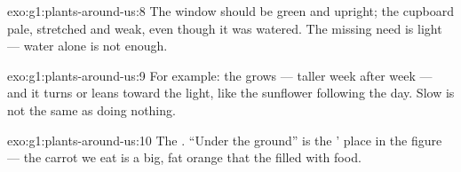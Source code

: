 \begin{solution}{exo:g1:plants-around-us:8}
The window  should be green and upright; the cupboard 
pale, stretched and weak, even though it was watered. The missing
need is light --- water alone is not enough.
\end{solution}

\begin{solution}{exo:g1:plants-around-us:9}
For example: the  grows --- taller week after week --- and it
turns or leans toward the light, like the sunflower following the
day. Slow is not the same as doing nothing.
\end{solution}

\begin{solution}{exo:g1:plants-around-us:10}
The . ``Under the ground'' is the ' place in the figure
--- the carrot we eat is a big, fat orange  that the 
filled with food.
\end{solution}

